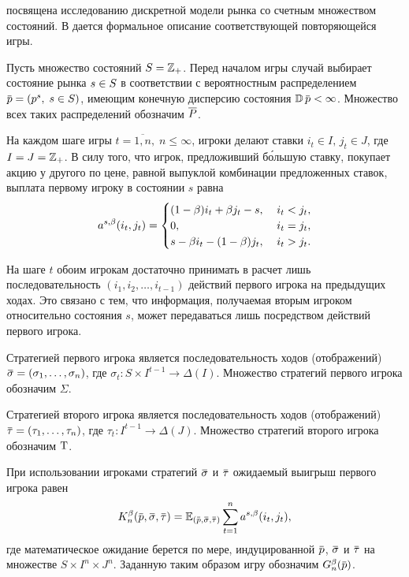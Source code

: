  посвящена исследованию дискретной модели рынка со счетным множеством состояний.
В  дается формальное описание соответствующей повторяющейся игры.

Пусть множество состояний $S = \mathbb{Z}_+$.
Перед началом игры случай выбирает состояние рынка $s \in S$ в соответствии с вероятностным распределением $\p = (p^s, \; s \in S)$, имеющим конечную дисперсию состояния $\D \p < \infty$.
Множество всех таких распределений обозначим $\overline{P}$.

На каждом шаге игры $t = \overline{1,n}, \; n \leqslant \infty$, игроки делают ставки $i_t \in I, \, j_t \in J$, где $I = J = \mathbb{Z}_+$.
В силу того, что игрок, предложивший б\'{о}льшую ставку, покупает акцию у другого по цене, равной выпуклой комбинации предложенных ставок, выплата первому игроку в состоянии $s$ равна
\begin{equation*}
  a^{s,\beta}(i_t, j_t) =
  \begin{cases}
    (1-\beta) i_t + \beta j_t - s, &\; i_t < j_t, \\
    0, &\; i_t = j_t, \\
    s - \beta i_t - (1-\beta)j_t, &\; i_t > j_t.
  \end{cases}
\end{equation*}

На шаге $t$ обоим игрокам достаточно принимать в расчет лишь последовательность $(i_1, i_2, \ldots, i_{t-1})$ действий первого игрока на предыдущих ходах.
Это связано с тем, что информация, получаемая вторым игроком относительно состояния $s$, может передаваться лишь посредством действий первого игрока.

Стратегией первого игрока является последовательность ходов (отображений) $\sigmav = (\sigma_1, \ldots, \sigma_n)$, где $\sigma_t: S \times I^{t-1} \rightarrow \Delta(I)$.
Множество стратегий первого игрока обозначим $\Sigma$.

Стратегией второго игрока является последовательность ходов (отображений) $\tauv = (\tau_1, \ldots, \tau_n)$, где $\tau_t: I^{t-1} \rightarrow \Delta(J)$.
Множество стратегий второго игрока обозначим $\mathrm{T}$.

При использовании игроками стратегий $\sigmav$ и $\tauv$ ожидаемый выигрыш первого игрока равен
\begin{equation*}
  \K(\p, \sigmav, \tauv) =
  \E_{(\p, \sigmav, \tauv)} \sum_{t=1}^n \as(i_t, j_t),
\end{equation*}
где математическое ожидание берется по мере, индуцированной $\p$, $\sigmav$ и $\tauv$ на множестве $S \times I^n \times J^n$.
Заданную таким образом игру обозначим $\theG(\p)$.

